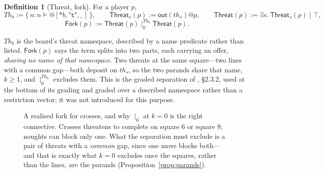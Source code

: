 \documentclass[11pt]{article}
\theoremstyle{definition}
\newtheorem{definition}{Definition}
\theoremstyle{plain}
\theoremstyle{remark}
\newcommand{\Thr}{\mathsf{Threat}}
\newcommand{\Frk}{\mathsf{Fork}}
\newcommand{\lout}{\mathsf{out}}
\begin{document}
\begin{definition}[Threat, fork]\label{def:fork}
For a player $p$,
\[
\mathit{Th}_b := \{\, n : n \models @[*b,\texttt{"t"},\_\,] \,\}, \qquad
\Thr_s(p) := \lout(\mathit{th}_s)@p, \qquad
\Thr(p) := \exists s.\ \Thr_s(p) \mid \top,
\]
\[
\Frk(p) := \Thr(p) \mid_0^{\mathit{Th}_b} \Thr(p) .
\]
\end{definition}

$\mathit{Th}_b$ is the board's threat namespace, described by a name predicate
rather than listed. $\Frk(p)$ says the term splits into two parts, each carrying
an offer, \emph{sharing no name of that namespace}. Two threats at the same
square---two lines with a common gap---both deposit on $\mathit{th}_s$, so the
two parands share that name, $k \geq 1$, and $\mid_0^{\mathit{Th}_b}$ excludes
them. This is the graded separation of \cite{classifier}, \S2.3.2, used at the
bottom of its grading and graded over a described namespace rather than a
restriction vector; it was not introduced for this purpose.

\begin{figure}[t]
\centering
{}
\caption{A realised fork for crosses, and why $\mid_0$ at $k=0$ is the right
connective. Crosses threatens to complete on square $6$ or square $8$; noughts
can block only one. What the separation must exclude is a pair of threats with a
\emph{common} gap, since one move blocks both---and that is exactly what $k=0$
excludes once the squares, rather than the lines, are the parands
(Proposition~\ref{prop:parands}).}
\label{fig:fork}
\end{figure}
\end{document}
